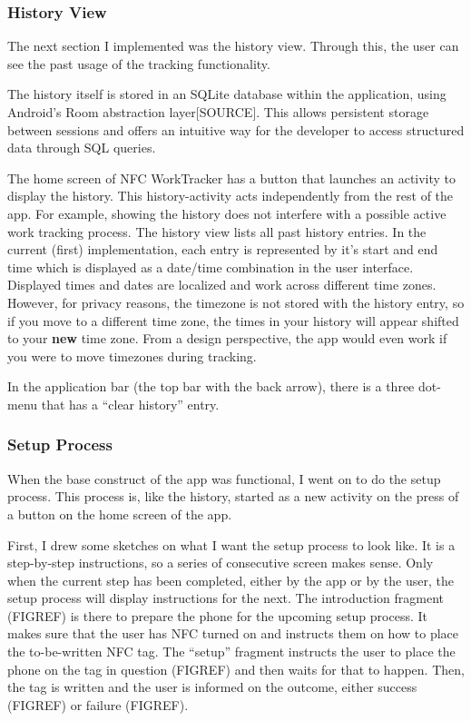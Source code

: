 \documentclass[conference]{IEEEtran}
\newcommand{\projectname}{NFC WorkTracker}
\begin{document}
\subsubsection{History View}
The next section I implemented was the history view. Through this, the user can see the past usage of the tracking functionality.

The history itself is stored in an SQLite database within the application, using Android's Room abstraction layer[SOURCE]. This allows persistent storage between sessions and offers an intuitive way for the developer to access structured data through SQL queries.

The home screen of \projectname{} has a button that launches an activity to display the history. This history-activity acts independently from the rest of the app. For example, showing the history does not interfere with a possible active work tracking process. The history view lists all past history entries. In the current (first) implementation, each entry is represented by it's start and end time which is displayed as a date/time combination in the user interface. Displayed times and dates are localized and work across different time zones. However, for privacy reasons, the timezone is not stored with the history entry, so if you move to a different time zone, the times in your history will appear shifted to your \textbf{new} time zone. From a design perspective, the app would even work if you were to move timezones during tracking.

In the application bar (the top bar with the back arrow), there is a three dot-menu that has a ``clear history'' entry.

\subsubsection{Setup Process}
When the base construct of the app was functional, I went on to do the setup process. This process is, like the history, started as a new activity on the press of a button on the home screen of the app.

First, I drew some sketches on what I want the setup process to look like. It is a step-by-step instructions, so a series of consecutive screen makes sense. Only when the current step has been completed, either by the app or by the user, the setup process will display instructions for the next.
The introduction fragment (FIGREF) is there to prepare the phone for the upcoming setup process. It makes sure that the user has NFC turned on and instructs them on how to place the to-be-written NFC tag. The ``setup'' fragment instructs the user to place the phone on the tag in question (FIGREF) and then waits for that to happen. Then, the tag is written and the user is informed on the outcome, either success (FIGREF) or failure (FIGREF).
\end{document}
